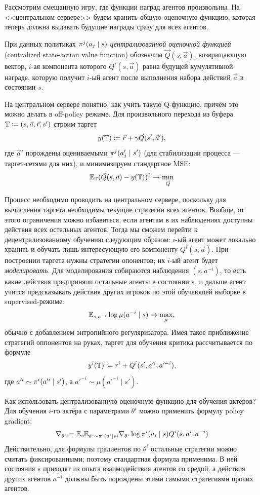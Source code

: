 Рассмотрим смешанную игру, где функции наград агентов произвольны. На <<центральном сервере>> будем хранить общую оценочную функцию, которая теперь должна выдавать будущие награды сразу для всех агентов. 

\begin{definition}
При данных политиках $\pi^j(a_j \HM\mid s)$ \emph{централизованной оценочной функцией} (centralized state-action value function)  обозначим $\vec{Q}(s, \vec{a})$, возвращающую вектор, $i$-ая компонента которого $Q^i(s, \vec{a})$ равна будущей кумулятивной награде, которую получит $i$-ый агент после выполнения набора действий $\vec{a}$ в состоянии $s$.
\end{definition}

На центральном сервере понятно, как учить такую Q-функцию, причём это можно делать в off-policy режиме. Для произвольного перехода из буфера $\mathbb{T} \coloneqq (s, \vec{a}, \vec{r}, s')$ строим таргет
$$y(\mathbb{T}) \coloneqq \vec{r} + \gamma \vec{Q}(s', \vec{a}'),$$
где $\vec{a}'$ порождены оцениваемыми $\pi^j(a'_j \HM\mid s')$ (для стабилизации процесса --- таргет-сетями для них), и минимизируем стандартное MSE:
$$\mathbb{E}_{\mathbb{T}} (\vec{Q}(s, \vec{a}) - y(\mathbb{T}))^2 \to \min_{\vec{Q}}$$

Процесс необходимо проводить на центральном сервере, поскольку для вычисления таргета необходимы текущие стратегии всех агентов. Вообще, от этого ограничения можно избавиться, если агентам в их наблюдениях доступны действия всех остальных агентов. Тогда мы сможем перейти к децентрализованному обучению следующим образом: $i$-ый агент может локально хранить и обучать лишь интересующую его компоненту $Q^i(s, \vec{a})$. При построении таргета нужны стратегии опонентов; их $i$-ый агент будет \emph{моделировать}. Для моделирования собираются наблюдения $(s, a^{-i})$, то есть какие действия предприняли остальные агенты в состоянии $s$, и дальше агент учится предсказывать действия других игроков по этой обучающей выборке в supervised-режиме:
$$\mathbb{E}_{s, a^{-i}} \log \mu(a^{-i} \mid s) \to \max_{\mu},$$
обычно с добавлением энтропийного регуляризатора. Имея такое приближение стратегий оппонентов на руках, таргет для обучения критика рассчитывается по формуле
$$y^i(\mathbb{T}) \coloneqq r^i + Q^i(s', a'^i, a'^{-i}),$$
где $a'^i \HM\sim \pi^i(a'^i \mid s')$, а $a'^{-i} \sim \mu(a'^{-i} \mid s')$.

Как использовать централизованную оценочную функцию для обучения актёров? Для обучения $i$-го актёра с параметрами $\theta^i$ можно применить формулу policy gradient:
\begin{equation}\label{MAPG}
\nabla_{\theta^i} = \E_{s} \E_{a^i \sim \pi^i(a^i \mid s)} \nabla_{\theta^i} \log \pi^i(a_i \HM\mid s) Q^i(s, a^i, a^{-i})
\end{equation}
Действительно, для формулы градиентов по $\theta^i$ остальные стратегии можно считать фиксированными; поэтому стандартная формула применима. В ней состояния $s$ приходят из опыта взаимодействия агентов со средой, а действия других агентов $a^{-i}$ должны быть порождены этими самыми стратегиями прочих агентов. 

